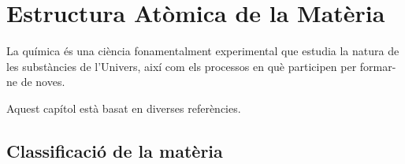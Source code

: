 \chapter{Estructura Atòmica de la Matèria}
La química és una ciència fonamentalment experimental que estudia la natura de les substàncies de l'Univers, així com els processos en què participen per formar-ne de noves.

Aquest capítol està basat en diverses referències.%

\section{Classificació de la matèria}

